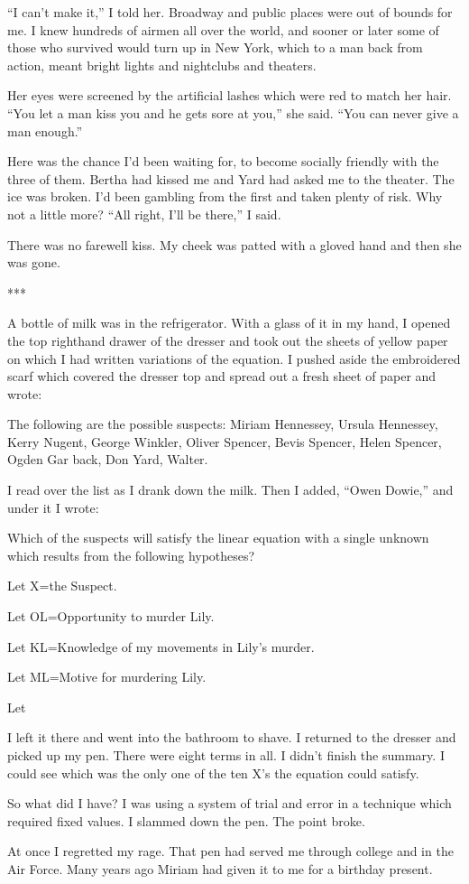 \documentclass{novel}
\begin{document}
{“I can’t make it,” I told her. Broadway and public places were out of bounds for me. I knew hundreds of airmen all over the world, and sooner or later some of those who survived would turn up in New York, which to a man back from action, meant bright lights and nightclubs and theaters.

Her eyes were screened by the artificial lashes which were red to match her hair. “You let a man kiss you and he gets sore at you,” she said. “You can never give a man enough.”

Here was the chance I’d been waiting for, to become socially friendly with the three of them. Bertha had kissed me and Yard had asked me to the theater. The ice was broken. I’d been gambling from the first and taken plenty of risk. Why not a little more? “All right, I’ll be there,” I said.

There was no farewell kiss. My cheek was patted with a gloved hand and then she was gone.

***

A bottle of milk was in the refrigerator. With a glass of it in my hand, I opened the top righthand drawer of the dresser and took out the sheets of yellow paper on which I had written variations of the equation. I pushed aside the embroidered scarf which covered the dresser top and spread out a fresh sheet of paper and wrote:

The following are the possible suspects: Miriam Hennessey, Ursula Hennessey, Kerry Nugent, George Winkler, Oliver Spencer, Bevis Spencer, Helen Spencer, Ogden Gar back, Don Yard, Walter.

I read over the list as I drank down the milk. Then I added, “Owen Dowie,” and under it I wrote:

Which of the suspects will satisfy the linear equation with a single unknown which results from the following hypotheses?

Let X=the Suspect.

Let OL=Opportunity to murder Lily.

Let KL=Knowledge of my movements in Lily’s murder.

Let ML=Motive for murdering Lily.

Let

I left it there and went into the bathroom to shave. I returned to the dresser and picked up my pen. There were eight terms in all. I didn’t finish the summary. I could see which was the only one of the ten X’s the equation could satisfy.

So what did I have? I was using a system of trial and error in a technique which required fixed values. I slammed down the pen. The point broke.

At once I regretted my rage. That pen had served me through college and in the Air Force. Many years ago Miriam had given it to me for a birthday present.

}
\end{document}
